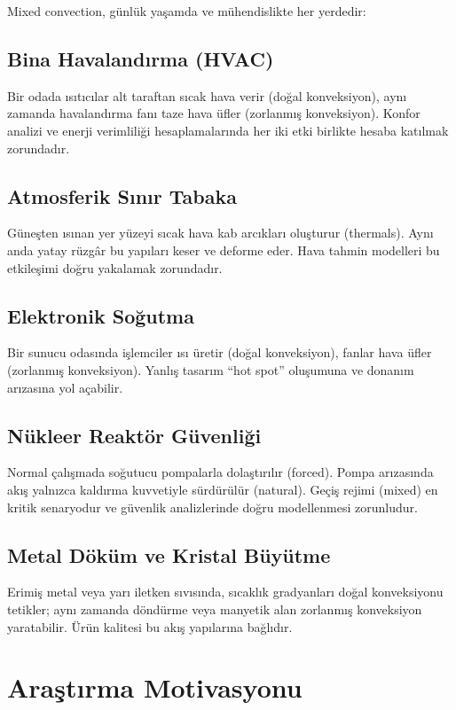 Mixed convection, günlük yaşamda ve mühendislikte her yerdedir:

\subsection{Bina Havalandırma (HVAC)}
Bir odada ısıtıcılar alt taraftan sıcak hava verir (doğal konveksiyon), aynı zamanda havalandırma fanı taze hava üfler (zorlanmış konveksiyon). Konfor analizi ve enerji verimliliği hesaplamalarında her iki etki birlikte hesaba katılmak zorundadır.

\subsection{Atmosferik Sınır Tabaka}
Güneşten ısınan yer yüzeyi sıcak hava kab arcıkları oluşturur (thermals). Aynı anda yatay rüzgâr bu yapıları keser ve deforme eder. Hava tahmin modelleri bu etkileşimi doğru yakalamak zorundadır.

\subsection{Elektronik Soğutma}
Bir sunucu odasında işlemciler ısı üretir (doğal konveksiyon), fanlar hava üfler (zorlanmış konveksiyon). Yanlış tasarım ``hot spot'' oluşumuna ve donanım arızasına yol açabilir.

\subsection{Nükleer Reaktör Güvenliği}
Normal çalışmada soğutucu pompalarla dolaştırılır (forced). Pompa arızasında akış yalnızca kaldırma kuvvetiyle sürdürülür (natural). Geçiş rejimi (mixed) en kritik senaryodur ve güvenlik analizlerinde doğru modellenmesi zorunludur.

\subsection{Metal Döküm ve Kristal Büyütme}
Erimiş metal veya yarı iletken sıvısında, sıcaklık gradyanları doğal konveksiyonu tetikler; aynı zamanda döndürme veya manyetik alan zorlanmış konveksiyon yaratabilir. Ürün kalitesi bu akış yapılarına bağlıdır.


\section{Araştırma Motivasyonu}
\label{sec:motivasyon}

